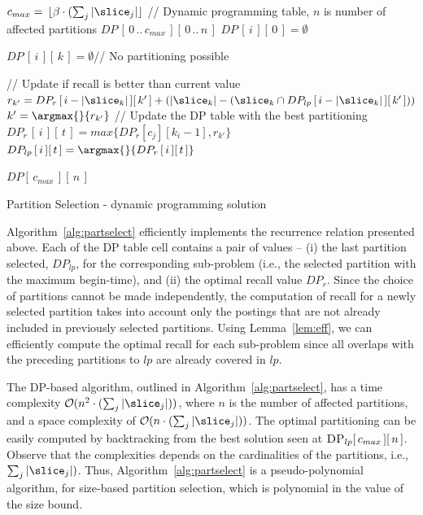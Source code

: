  \begin{algorithm}[htb!]
   \begin{algorithmic}[1]
     \STATE $c_{max}=\,\lfloor \beta \cdot (\sum_{j}
   |\slice_{j}|  \rfloor$ 
   \STATE // Dynamic programming table, $n$ is number of affected partitions
   \STATE $DP\,[\,0\,..\,c_{max}\,][\,0\,..\,n\,]$ \quad 
  \STATE {}
     \STATE $DP\,[\,i\,][\,0\,] = \emptyset$
      \ENDFOR
 
  \STATE {} 
         \STATE $DP\,[\,i\,][\,k\,] = \emptyset$\quad // No partitioning possible
      \ENDFOR
     
          \STATE // Update if recall is better than current value
          \STATE $r_{k'} = DP_r\,[\, i - |\slice_{k}|\,][\,k'\,] + (|\slice_{k}| - (\slice_{k} \cap DP_{lp}\,[\,i - |\slice_{k}|\,][\,k'\,]))$ 
        \ENDFOR
        \STATE $k' = \argmax{}{r_{k'}}$
        \STATE   // Update the DP table with the best partitioning
            \STATE  $DP_r\,[\,i\,][\,t\,] = max \{ DP_r[c_j][k_i - 1], r_{k'} \}$
        \STATE    $DP_{lp}\,[\,i\,][\,t\,] = \argmax{}{DP_r\,[\,i\,][\,t\,]}$ 
              
          \ENDFOR
        \ENDFOR
      \STATE {} $DP[\,c_{max}\,][\,n\,]$ 
   \end{algorithmic}
   \caption{Partition Selection - dynamic programming solution}
   \label{alg:partselect}
 \end{algorithm}

Algorithm~\ref{alg:partselect} efficiently implements the recurrence relation presented above. Each of the \textsc{DP} table cell contains a pair of values -- (i) the last partition selected, $DP_{lp}$, for the corresponding sub-problem (i.e., the selected partition with the maximum begin-time), and (ii) the optimal recall value $DP_r$. Since the choice of partitions cannot be
made independently, the computation of recall for a newly selected
partition takes into account only the postings that are not already
included in previously selected partitions. Using Lemma~\ref{lem:eff},
we can efficiently compute the optimal recall for each sub-problem
since all overlaps with the preceding partitions to $lp$ are already
covered in $lp$. 

 The \textsc{DP}-based algorithm, outlined in Algorithm~\ref{alg:partselect}, has a time complexity $\mathcal{O}(n^2 \cdot (\sum_j |\slice_{j}|))$, where $n$ is the number of affected partitions, and a space
 complexity of $\mathcal{O}(n \cdot (\sum_j |\slice_{j}|))$. The optimal partitioning can be easily computed by backtracking from the best solution seen at $\textsc{DP}_{lp}[\,c_{max}\,][\,n\,]$. Observe that the complexities depends on the cardinalities of the partitions, i.e.,$\sum_j |\slice_{j}|)$. Thus, Algorithm~\ref{alg:partselect} is a pseudo-polynomial algorithm, for size-based partition selection, which is polynomial in the value of the size bound.
 

